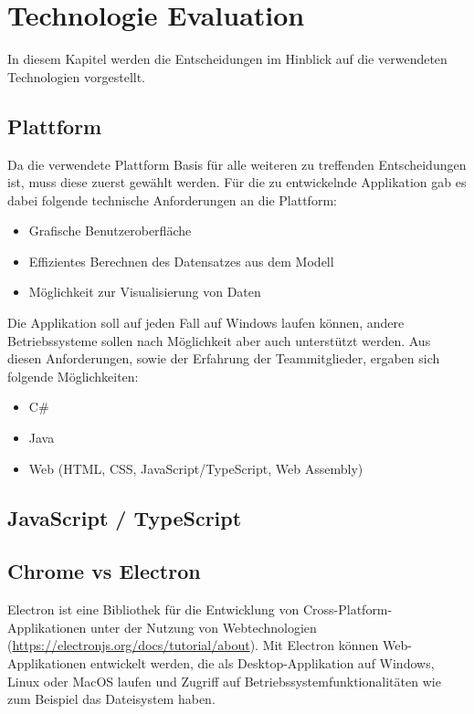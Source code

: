 
\chapter{Technologie Evaluation}

In diesem Kapitel werden die Entscheidungen im Hinblick auf die verwendeten Technologien vorgestellt.

\section{Plattform}

Da die verwendete Plattform Basis für alle weiteren zu treffenden Entscheidungen ist, muss diese zuerst gewählt werden. Für die zu entwickelnde Applikation gab es dabei folgende technische Anforderungen an die Plattform:

\begin{itemize}
    \item Grafische Benutzeroberfläche
    \item Effizientes Berechnen des Datensatzes aus dem Modell
    \item Möglichkeit zur Visualisierung von Daten
\end{itemize}

Die Applikation soll auf jeden Fall auf Windows laufen können, andere Betriebssysteme sollen nach Möglichkeit aber auch unterstützt werden. Aus diesen Anforderungen, sowie der Erfahrung der Teammitglieder, ergaben sich folgende Möglichkeiten:
\begin{itemize}
    \item C\#
    \item Java
    \item Web (HTML, CSS, JavaScript/TypeScript, Web Assembly)
\end{itemize}


\section{JavaScript / TypeScript}

\section{Chrome vs Electron}

Electron ist eine Bibliothek für die Entwicklung von Cross-Platform-Applikationen unter der Nutzung von Webtechnologien (\url{https://electronjs.org/docs/tutorial/about}). Mit Electron können Web-Applikationen entwickelt werden, die als Desktop-Applikation auf Windows, Linux oder MacOS laufen und Zugriff auf Betriebssystemfunktionalitäten wie zum Beispiel das Dateisystem haben.

